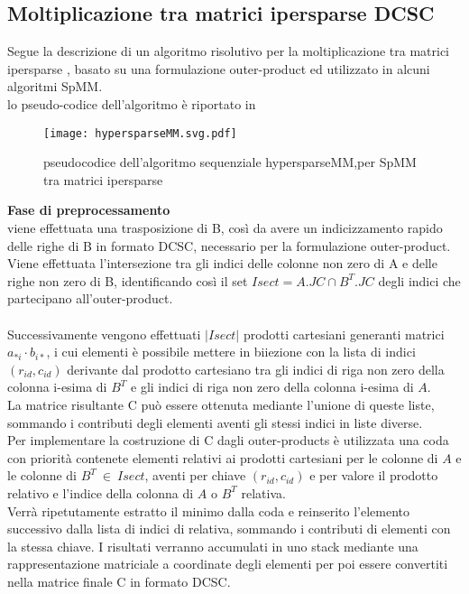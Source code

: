 \subsection{Moltiplicazione tra matrici ipersparse DCSC}
\label{ssec:hypersparseMM}
Segue la descrizione di un algoritmo risolutivo per la moltiplicazione tra matrici
ipersparse , basato su una formulazione outer-product ed
utilizzato in alcuni algoritmi SpMM.\\
lo pseudo-codice dell'algoritmo è riportato in  
\begin{figure}[H]
  \centering \texttt{[image: hypersparseMM.svg.pdf]}
  \caption[pseudocodice hypersparseMM]{pseudocodice dell'algoritmo sequenziale hypersparseMM,per SpMM tra matrici ipersparse} 
  \decoRule \label{figCode:hypersparseMM}
\end{figure}

{\bf {Fase di preprocessamento}} \\
viene effettuata una trasposizione di B, così da avere un indicizzamento rapido delle righe di B
in formato DCSC, necessario per la
formulazione outer-product.\\ 
Viene effettuata l'intersezione tra gli indici delle colonne non zero di A e
delle righe non zero di B, identificando così il set $Isect = A.JC \cap B^T.JC$ degli
indici che partecipano all'outer-product.\\
\\
Successivamente vengono effettuati $|Isect|$ prodotti cartesiani  
generanti matrici $a_{*i} \cdot b_{i*}$, i cui elementi è possibile mettere in biiezione 
con la lista di indici $(r_{id},c_{id})$ derivante dal prodotto cartesiano tra gli indici
di riga non zero della colonna i-esima di $B^T$ e gli indici di riga non zero 
della colonna i-esima di $A$.\\
La matrice risultante C può essere ottenuta mediante l'unione di queste liste,
sommando i contributi degli elementi aventi gli stessi indici in liste
diverse.\\
Per implementare la costruzione di C dagli outer-products
è utilizzata una coda con priorità contenete elementi relativi ai
prodotti cartesiani per le colonne di $A$ e le colonne di $B^T ~\in~ Isect$, 
aventi per chiave $(r_{id},c_{id})$ e per valore il prodotto relativo e l'indice
della colonna di $A$ o $B^T$ relativa.\\
Verrà ripetutamente estratto il minimo dalla coda e reinserito
l'elemento successivo dalla lista di indici di relativa, sommando i
contributi di elementi con la stessa chiave.
I risultati verranno accumulati in uno stack mediante una rappresentazione
matriciale a coordinate degli elementi %
per poi essere convertiti nella matrice finale C in formato DCSC.\\

